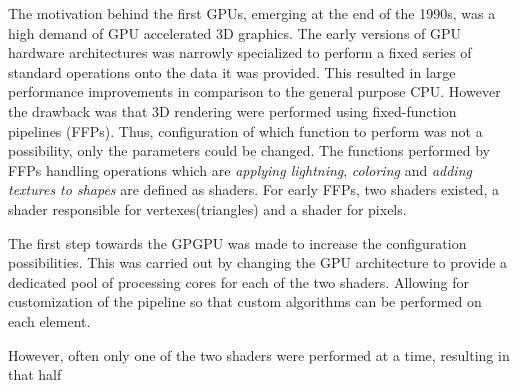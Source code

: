 The motivation behind the first GPUs, emerging at the end of the 1990s, was a high demand of GPU accelerated 3D graphics.
The early versions of GPU hardware architectures was narrowly specialized to perform a fixed series of standard operations onto the data it was provided.
This resulted in large performance improvements in comparison to the general purpose CPU.
However the drawback was that 3D rendering were performed using fixed-function pipelines (FFPs).
Thus, configuration of which function to perform was not a possibility, only the parameters could be changed.
The functions performed by FFPs handling operations which are \textit{applying lightning}, \textit{coloring} and \textit{adding textures to shapes} are defined as shaders.
For early FFPs, two shaders existed, a shader responsible for vertexes(triangles) and a shader for pixels.


The first step towards the GPGPU was made to increase the configuration possibilities.
This was carried out by changing the GPU architecture to provide a dedicated pool of processing cores for each of the two shaders.
Allowing for customization of the pipeline so that custom algorithms can be performed on each element.

However, often only one of the two shaders were performed at a time, resulting in that half %

